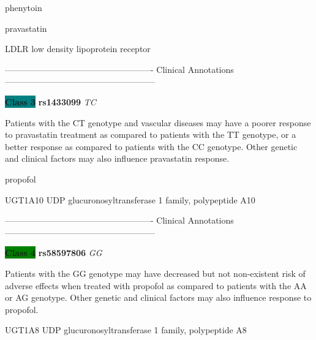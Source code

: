 \documentclass{resume} %
\begin{document}
\begin{rSection}{ phenytoin }
\end{rSection}\begin{rSection}{ pravastatin }
\item[]

\begin{rSubsection}{ LDLR }{ low density lipoprotein receptor }{}{}
\item[]

\item[] ---------------------------------------------------- Clinical Annotations -----------------------------------------------------\newline
\item \textbf{\colorbox{teal} {Class 3}} \textbf{ rs1433099 } \textit{ TC }
\item[] Patients with the CT genotype and vascular diseases may have a poorer response to pravastatin treatment as compared to patients with the TT genotype, or a better response as compared to patients with the CC genotype. Other genetic and clinical factors may also influence pravastatin response. 
\end{rSubsection}

\end{rSection}\begin{rSection}{ propofol }
\item[]

\begin{rSubsection}{ UGT1A10 }{ UDP glucuronosyltransferase 1 family, polypeptide A10 }{}{}
\item[]

\item[] ---------------------------------------------------- Clinical Annotations -----------------------------------------------------\newline
\item \textbf{\colorbox{green} {Class 4}} \textbf{ rs58597806 } \textit{ GG }
\item[] Patients with the GG genotype may have decreased but not non-existent risk of adverse effects when treated with propofol as compared to patients with the AA or AG genotype. Other genetic and clinical factors may also influence response to propofol.
\end{rSubsection}\begin{rSubsection}{ UGT1A8 }{ UDP glucuronosyltransferase 1 family, polypeptide A8 }{}{}
\item[]


\end{rSubsection}
\end{rSection}
\end{document}
